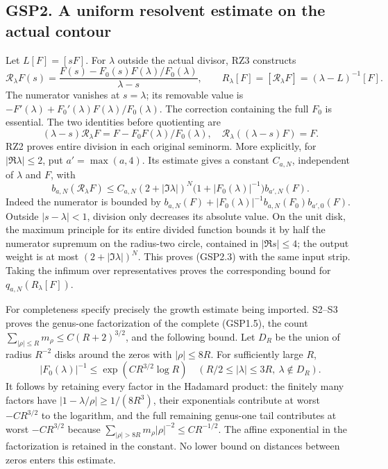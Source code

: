 \subsection{GSP2. A uniform resolvent estimate on the actual
contour}\label{gsp2.-a-uniform-resolvent-estimate-on-the-actual-contour}

Let \(L[F]=[sF]\). For \(\lambda\) outside the actual divisor, RZ3
constructs \[
\mathscr R_\lambda F(s)
=\frac{F(s)-F_0(s)F(\lambda)/F_0(\lambda)}{\lambda-s},\qquad
R_\lambda[F]=[\mathscr R_\lambda F]=(\lambda-L)^{-1}[F].
\tag{GSP2.1}
\] The numerator vanishes at \(s=\lambda\); its removable value is
\(-F'(\lambda)+F_0'(\lambda)F(\lambda)/F_0(\lambda)\). The correction
containing the full \(F_0\) is essential. The two identities before
quotienting are \[
(\lambda-s)\mathscr R_\lambda F=F-F_0F(\lambda)/F_0(\lambda),
\quad \mathscr R_\lambda((\lambda-s)F)=F.
\tag{GSP2.2}
\] RZ2 proves entire division in each original seminorm. More
explicitly, for \(|\Re\lambda|\le2\), put \(a'=\max(a,4)\). Its estimate
gives a constant \(C_{a,N}\), independent of \(\lambda\) and \(F\), with
\[
b_{a,N}(\mathscr R_\lambda F)
\le C_{a,N}(2+|\Im\lambda|)^N
\bigl(1+|F_0(\lambda)|^{-1}\bigr)b_{a',N}(F).
\tag{GSP2.3}
\] Indeed the numerator is bounded by
\(b_{a,N}(F)+|F_0(\lambda)|^{-1}b_{a,N}(F_0)b_{a',0}(F)\). Outside
\(|s-\lambda|<1\), division only decreases its absolute value. On the
unit disk, the maximum principle for its entire divided function bounds
it by half the numerator supremum on the radius-two circle, contained in
\(|\Re s|\le4\); the output weight is at most \((2+|\Im\lambda|)^N\).
This proves (GSP2.3) with the same input strip. Taking the infimum over
representatives proves the corresponding bound for
\(q_{a,N}(R_\lambda[F])\).

For completeness specify precisely the growth estimate being imported.
S2--S3 proves the genus-one factorization of the complete (GSP1.5), the
count \(\sum_{|\rho|\le R}m_\rho\le C(R+2)^{3/2}\), and the following
bound. Let \(D_R\) be the union of radius \(R^{-2}\) disks around the
zeros with \(|\rho|\le8R\). For sufficiently large \(R\), \[
|F_0(\lambda)|^{-1}\le
\exp(CR^{3/2}\log R)
\quad(R/2\le|\lambda|\le3R,\ \lambda\notin D_R).
\tag{GSP2.4}
\] It follows by retaining every factor in the Hadamard product: the
finitely many factors have \(|1-\lambda/\rho|\ge1/(8R^3)\), their
exponentials contribute at worst \(-CR^{3/2}\) to the logarithm, and the
full remaining genus-one tail contributes at worst \(-CR^{3/2}\) because
\(\sum_{|\rho|>8R}m_\rho|\rho|^{-2}\le CR^{-1/2}\). The affine
exponential in the factorization is retained in the constant. No lower
bound on distances between zeros enters this estimate.

